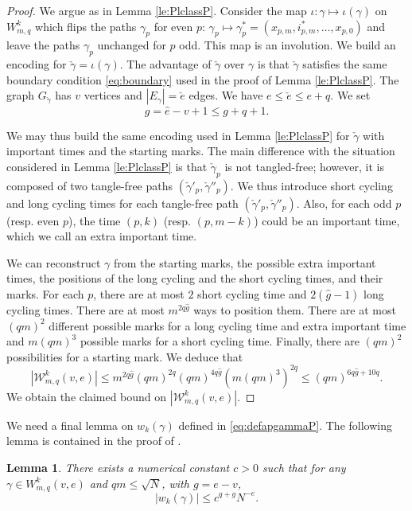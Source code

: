 \documentclass[11pt]{article}
\newtheorem{lemma}{Lemma}[section]
\newcommand{\cW}{\mathcal {W}}
\newcommand{\1}{1\!\!{\sf I}}
\begin{document}
\begin{proof}
We argue as in Lemma \ref{le:PlclassP}. Consider the map $\iota : \gamma \mapsto \iota(\gamma)$ on $W_{m,q}^k$ which flips the paths $\gamma_p$ for even $p$: $\gamma_p \mapsto \gamma^*_p = (x_{p,m},i^*_{p,m},\ldots,x_{p,0})$ and leave the paths $\gamma_p$ unchanged for $p$ odd. This map is an involution. We build an encoding for $\check \gamma = \iota(\gamma)$. The advantage of $\check \gamma$ over $\gamma$ is that $\check \gamma$ satisfies the same boundary condition \eqref{eq:boundary} used in the proof of Lemma \ref{le:PlclassP}. The graph $G_{\check \gamma}$ has $v$ vertices and $|E_\gamma | = \check e$ edges. We have $e \leq 
\check e \leq e + q$.
We set 
$$
\hat g = \hat e - v + 1 \leq g + q + 1.
$$ 

We may thus build the same encoding used in Lemma \ref{le:PlclassP} for $\check \gamma$ with important times and the starting marks. The main difference with the situation considered in Lemma \ref{le:PlclassP} is that $\check \gamma_p$ is not tangled-free; however, it is composed of two tangle-free paths $(\check \gamma'_p,\check \gamma''_p)$. We thus introduce short cycling and long cycling times for each tangle-free path $(\check \gamma'_p,\check \gamma''_p)$. Also, for each odd $p$ (resp. even $p$), the time $(p,k)$  (resp. $(p,m-k)$) could be an important time, which we call an extra important time.
 
We can reconstruct $\gamma$ from the starting marks, the possible extra important times, the positions of the long cycling 
and the short cycling times, and their marks. For each $p$, there are at most $2$ short cycling time and $2( \hat g-1)$ long cycling 
times. There are at most $  m^{ 2q \hat g}$ ways to position them. There are at most $(qm)^2$ different possible marks for a
long cycling time and extra important time and $m (qm)^3$ possible marks for a short cycling time. Finally, there are $ (q m) ^2 $ possibilities for a 
starting mark. We deduce that    
$$
| \cW^k _{m,q} (v,e) | \leq    m^{2 q\hat  g} (  q m )^{2q}   ( q m ) ^{4q \hat g}(m ( qm)^3 )^{2q} \leq (qm)^{6q \hat g + 10q}. 
$$
We obtain the claimed bound on $| \cW^k _{m,q} (v,e) |$.  \end{proof}

We need a final lemma on $w_k(\gamma)$ defined in \eqref{eq:defapgammaP}. The following lemma is contained in the proof of \cite[Lemma 27]{MR4024563}. 

\begin{lemma}\label{le:isopathR}
There exists a numerical constant $c >0$ such that for any $\gamma\in W^k_{m,q}(v,e)$ and $ q m  \leq \sqrt{ N}$, with $g = e - v$,
$$
 |w_k(\gamma) | \leq  c^{q + g} N^{-e}. 
$$

\end{lemma}
\end{document}
